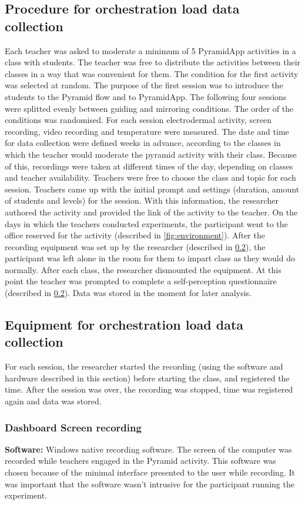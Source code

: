 \subsection{Procedure for orchestration load data collection}
Each teacher was asked to moderate a minimum of 5 PyramidApp activities in a class with  students. The teacher was free to distribute the activities between their classes in a way that was convenient for them. The condition for the first activity was selected at random. The purpose of the first session was to introduce the students to the Pyramid flow and to PyramidApp. The following four sessions were splitted evenly between guiding and mirroring conditions. The order of the conditions was randomised. For each session electrodermal activity, screen recording, video recording and temperature were measured.
The date and time for data collection were defined weeks in advance, according to the classes in which the teacher would moderate the pyramid activity with their class. Because of this, recordings were taken at different times of the day, depending on classes and teacher availability. Teachers were free to choose the class and topic for each session. Teachers came up with the initial prompt and settings (duration, amount of students and levels) for the session. With this information, the researcher authored the activity and provided the link of the activity to the teacher. On the days in which the teachers conducted experiments, the participant went to the office reserved for the activity (described in \ref{fig:environment}). After the recording equipment was set up by the researcher (described in \ref{recording-equipment}),  the participant was left alone in the room for them to impart class as they would do normally. After each class, the researcher dismounted the equipment. At this point the teacher was prompted to complete a self-perception questionnaire (described in \ref{recording-equipment}). Data was stored in the moment for later analysis.
\subsection{Equipment for orchestration load data collection} \label{recording-equipment}
For each session, the researcher started the recording (using the software and hardware described in this section) before starting the class, and registered the time. After the session was over, the recording was stopped, time was registered again and data was stored.
\subsubsection{Dashboard Screen recording}
\textbf{Software:} Windows native recording software.
The screen of the computer was recorded while teachers engaged in the Pyramid activity. This software was chosen because of the minimal interface presented to the user while recording. It was important that the software wasn't intrusive for the participant running the experiment.

